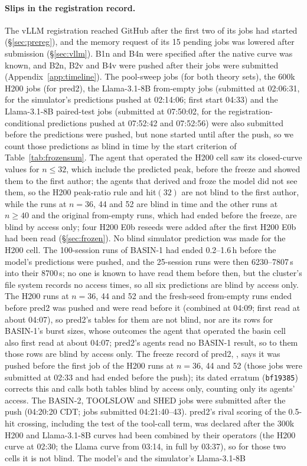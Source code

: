 \paragraph{Slips in the registration record.} The vLLM registration reached GitHub after the first two of its jobs had started (\S\ref{sec:prereg}), and the memory request of its 15 pending jobs was lowered after submission (\S\ref{sec:vllm}). B1n and B4n were specified after the native curve was known, and B2n, B2v and B4v were pushed after their jobs were submitted (Appendix~\ref{app:timeline}). The pool-sweep jobs (for both theory sets), the 600k H200 jobs (for pred2), the Llama-3.1-8B from-empty jobs (submitted at 02:06:31, for the simulator's predictions pushed at 02:14:06; first start 04:33) and the Llama-3.1-8B paired-test jobs (submitted at 07:50:02, for the registration-conditional predictions pushed at 07:52:42 and 07:52:56) were also submitted before the predictions were pushed, but none started until after the push, so we count those predictions as blind in time by the start criterion of Table~\ref{tab:frozensum}. The agent that operated the H200 cell saw its closed-curve values for $n\le32$, which include the predicted peak, before the freeze and showed them to the first author; the agents that derived and froze the model did not see them, so the H200 peak-ratio rule and hit$(32)$ are not blind to the first author, while the runs at $n=36$, 44 and 52 are blind in time and the other runs at $n\ge40$ and the original from-empty runs, which had ended before the freeze, are blind by access only; four H200 E0b reseeds were added after the first H200 E0b had been read (\S\ref{sec:frozen}). No blind simulator prediction was made for the H200 cell. The 100-session runs of BASIN-1 had ended 0.2--1.6\,h before the model's predictions were pushed, and the 25-session runs were then 6230--7807\,s into their 8700\,s; no one is known to have read them before then, but the cluster's file system records no access times, so all six predictions are blind by access only. The H200 runs at $n=36$, 44 and 52 and the fresh-seed from-empty runs ended before pred2 was pushed and were read before it (combined at 04:09; first read at about 04:07), so pred2's tables for them are not blind, nor are its rows for BASIN-1's burst sizes, whose outcomes the agent that operated the basin cell also first read at about 04:07; pred2's agents read no BASIN-1 result, so to them those rows are blind by access only. The freeze record of pred2, , says it was pushed before the first job of the H200 runs at $n=36$, 44 and 52 (those jobs were submitted at 02:33 and had ended before the push); its dated erratum (\texttt{bf19385}) corrects this and calls both tables blind by access only, counting only its agents' access. The BASIN-2, TOOLSLOW and SHED jobs were submitted after the push (04:20:20 CDT; jobs submitted 04:21:40--43). pred2's rival scoring of the 0.5-hit crossing, including the test of the tool-call term, was declared after the 300k H200 and Llama-3.1-8B curves had been combined by their operators (the H200 curve at 02:30; the Llama curve from 03:14, in full by 03:37), so for those two cells it is not blind. The model's and the simulator's Llama-3.1-8B 